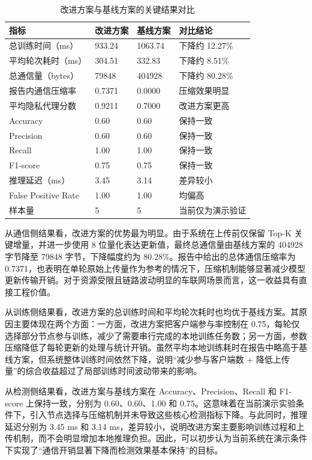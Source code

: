 \begin{table}[htbp]
    \centering
    \caption{改进方案与基线方案的关键结果对比}
    \label{tab:experiment-main-results}
    \begin{tabular}{p{4.2cm}p{2.8cm}p{2.8cm}p{2.0cm}}
        \toprule
        指标 & 改进方案 & 基线方案 & 对比结论 \\
        \midrule
        总训练时间（ms） & 933.24 & 1063.74 & 下降约 12.27\% \\
        平均轮次耗时（ms） & 304.51 & 332.83 & 下降约 8.51\% \\
        总通信量（bytes） & 79848 & 404928 & 下降约 80.28\% \\
        报告内通信压缩率 & 0.7371 & 0.0000 & 压缩效果明显 \\
        平均隐私代理分数 & 0.9211 & 0.7000 & 改进方案更高 \\
        Accuracy & 0.60 & 0.60 & 保持一致 \\
        Precision & 0.60 & 0.60 & 保持一致 \\
        Recall & 1.00 & 1.00 & 保持一致 \\
        F1-score & 0.75 & 0.75 & 保持一致 \\
        推理延迟（ms） & 3.45 & 3.14 & 差异较小 \\
        False Positive Rate & 1.00 & 1.00 & 均偏高 \\
        样本量 & 5 & 5 & 当前仅为演示验证 \\
        \bottomrule
    \end{tabular}
\end{table}

从通信侧结果看，改进方案的优势最为明显。由于系统在上传前仅保留 Top-K 关键增量，并进一步使用 8 位量化表达更新值，最终总通信量由基线方案的 404928 字节降至 79848 字节，下降幅度约为 80.28\%。报告中给出的总体通信压缩率为 0.7371，也表明在单轮原始上传量作为参考的情况下，压缩机制能够显著减少模型更新传输开销。对于资源受限且链路波动明显的车联网场景而言，这一收益具有直接工程价值。

从训练侧结果看，改进方案的总训练时间和平均轮次耗时也均优于基线方案。其原因主要体现在两个方面：一方面，改进方案把客户端参与率控制在 0.75，每轮仅选择部分节点参与训练，减少了需要串行完成的本地训练任务数；另一方面，参数压缩降低了每轮更新的处理与统计开销。虽然平均本地训练耗时在报告中略高于基线方案，但系统整体训练时间依然下降，说明“减少参与客户端数 + 降低上传量”的综合收益超过了局部训练时间波动带来的影响。

从检测侧结果看，改进方案与基线方案在 Accuracy、Precision、Recall 和 F1-score 上保持一致，分别为 0.60、0.60、1.00 和 0.75。这意味着在当前演示实验条件下，引入节点选择与压缩机制并未导致这些核心检测指标下降。与此同时，推理延迟分别为 3.45 ms 和 3.14 ms，差异较小，说明改进方案主要影响训练过程和上传机制，而不会明显增加本地推理负担。因此，可以初步认为当前系统在演示条件下实现了“通信开销显著下降而检测效果基本保持”的目标。

